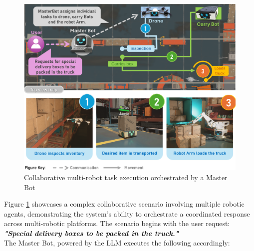 \documentclass[pdflatex,sn-mathphys-num]{sn-jnl}
\theoremstyle{thmstyleone}
\theoremstyle{thmstyletwo}%
\theoremstyle{thmstylethree}%
\begin{document}
\begin{figure}[H]
    \centering
    \includegraphics[width=1\textwidth]{figures/scenario2.png}
    \caption{Collaborative multi-robot task execution orchestrated by a Master Bot}\label{scenario2}
    \end{figure}
Figure \ref{scenario2} showcases a complex collaborative scenario involving multiple robotic agents, demonstrating the system's ability to orchestrate a coordinated response across multi-robotic platforms. The scenario begins with the user request:\\ \textbf{\textit{"Special delivery boxes to be packed in the truck."}} \\The Master Bot, powered by the LLM executes the following accordingly:
\end{document}
